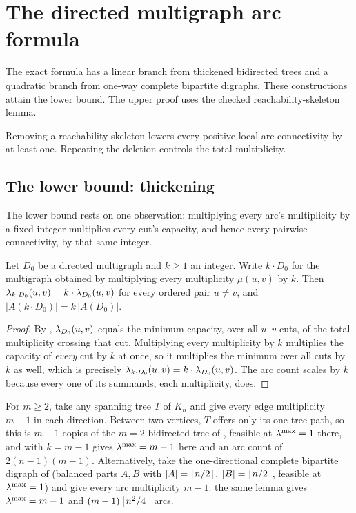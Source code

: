 \section{The directed multigraph arc formula}\label{sec:dir-multi}

The exact formula has a linear branch from thickened bidirected trees and a quadratic branch from one-way complete bipartite digraphs. These constructions attain the lower bound. The upper proof uses the checked reachability-skeleton lemma.

Removing a reachability skeleton lowers every positive local arc-connectivity by at least one. Repeating the deletion controls the total multiplicity.

\subsection{The lower bound: thickening}

The lower bound rests on one observation: multiplying every arc's multiplicity by a fixed integer multiplies every cut's capacity, and hence every pairwise connectivity, by that same integer.

\begin{lemma}[Thickening]\label{lem:thickening}
Let $D_0$ be a directed multigraph and $k \ge 1$ an integer. Write $k \cdot D_0$ for the multigraph obtained by multiplying every multiplicity $\mu(u,v)$ by $k$. Then $\lambda_{k \cdot D_0}(u,v) = k \cdot \lambda_{D_0}(u,v)$ for every ordered pair $u \ne v$, and $|A(k \cdot D_0)| = k\,|A(D_0)|$.
\end{lemma}

\begin{proof}
By , $\lambda_{D_0}(u,v)$ equals the minimum capacity, over all $u$--$v$ cuts, of the total multiplicity crossing that cut. Multiplying every multiplicity by $k$ multiplies the capacity of \emph{every} cut by $k$ at once, so it multiplies the minimum over all cuts by $k$ as well, which is precisely $\lambda_{k \cdot D_0}(u,v) = k \cdot \lambda_{D_0}(u,v)$. The arc count scales by $k$ because every one of its summands, each multiplicity, does.
\end{proof}

\begin{construction}\label{const:dir-multi-lower}
For $m \ge 2$, take any spanning tree $T$ of $K_n$ and give every edge multiplicity $m-1$ in each direction. Between two vertices, $T$ offers only its one tree path, so this is $m-1$ copies of the $m=2$ bidirected tree of , feasible at $\lambda^{\max} = 1$ there, and  with $k=m-1$ gives $\lambda^{\max} = m-1$ here and an arc count of $2(n-1)(m-1)$. Alternatively, take the one-directional complete bipartite digraph of  (balanced parts $A,B$ with $|A|=\left\lfloor n/2 \right\rfloor$, $|B|=\left\lceil n/2 \right\rceil$, feasible at $\lambda^{\max}=1$) and give every arc multiplicity $m-1$: the same lemma gives $\lambda^{\max} = m-1$ and $(m-1)\left\lfloor n^2/4 \right\rfloor$ arcs.
\end{construction}

